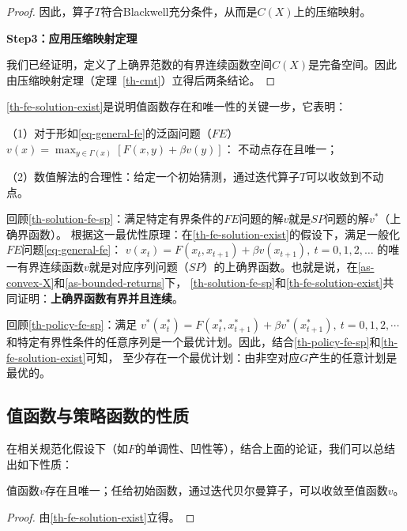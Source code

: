 \begin{proof}
    因此，算子$T$符合Blackwell充分条件，从而是$C\left(X\right)$上的压缩映射。

    \textbf{Step3：应用压缩映射定理}

    我们已经证明，定义了上确界范数的有界连续函数空间$C(X)$是完备空间。因此由压缩映射定理（定理~\ref{th-cmt}）立得后两条结论。
\end{proof}

\cref{th-fe-solution-exist}是说明值函数存在和唯一性的关键一步，它表明：

（1）对于形如\cref{eq-general-fe}的泛函问题（$FE$）
$v\left(x\right)=\max_{y\in\Gamma\left(x\right)}\left[F\left(x,y\right)+\beta v\left(y\right)\right]$：
不动点存在且唯一；

（2）数值解法的合理性：给定一个初始猜测，通过迭代算子$T$可以收敛到不动点。

回顾\cref{th-solution-fe-sp}：满足特定有界条件的$FE$问题的解$v$就是$SP$问题的解$v^*$（上确界函数）。
根据这一最优性原理：在\cref{th-fe-solution-exist}的假设下，满足一般化$FE$问题\cref{eq-general-fe}：
$v\left(x_t\right)=F\left(x_t, x_{t+1}\right)+\beta v\left(x_{t+1}\right), ~ t=0,1,2, \ldots$
的唯一有界连续函数$v$就是对应序列问题（$SP$）的上确界函数。也就是说，在\cref{as-convex-X}和\cref{as-bounded-returns}下，
\cref{th-solution-fe-sp}和\cref{th-fe-solution-exist}共同证明：\textbf{上确界函数有界并且连续}。

回顾\cref{th-policy-fe-sp}：满足
$v^*\left(x_t^*\right) = F\left(x_t^*,x_{t+1}^*\right) + \beta v^*\left(x_{t+1}^*\right), ~ t=0,1,2,\cdots$
和特定有界性条件的任意序列是一个最优计划。因此，结合\cref{th-policy-fe-sp}和\cref{th-fe-solution-exist}可知，
至少存在一个最优计划：由非空对应$G$产生的任意计划是最优的。


\subsection{值函数与策略函数的性质}

在相关规范化假设下（如$F$的单调性、凹性等），结合上面的论证，我们可以总结出如下性质：
\begin{property}
    值函数$v$存在且唯一；任给初始函数，通过迭代贝尔曼算子，可以收敛至值函数$v$。
\end{property}
\begin{proof}
    由\cref{th-fe-solution-exist}立得。
\end{proof}

